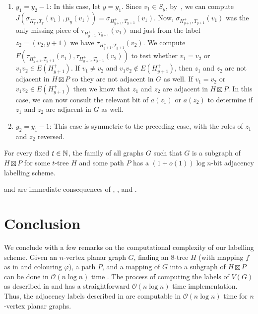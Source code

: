 \documentclass[kpfonts]{patmorin}
\newcommand{\Oh}{\mathcal{O}}
\let\le\leqslant
\begin{document}
\begin{enumerate}
  \item $y_1=y_2-1$: 
  In this case, let $y=y_1$. 
  Since $v_1 \in S_y$, by~,
  we can compute $J(\sigma_{H^+_y,T_y}(v_1),\mu_y(v_1))=\sigma_{H^+_{y+1},T_{y+1}}(v_1)$. 
  Now, $\sigma_{H^+_{y+1},T_{y+1}}(v_1)$ was the only missing piece of $\tau_{H^+_{y+1},T_{y+1}}(v_1)$ and 
  just from the label $z_2=(v_2,y+1)$ we have $\tau_{H^+_{y+1},T_{y+1}}(v_2)$. 
  We compute $F(\tau_{H^+_{y+1},T_{y+1}}(v_1),\tau_{H^+_{y+1},T_{y+1}}(v_2))$ to test whether $v_1=v_2$ or $v_1v_2\in E(H^+_{y+1})$. 
  If $v_1\neq v_2$ and $v_1v_2\not\in E(H^+_{y+1})$, then $z_1$ and $z_2$ are not adjacent in $H\boxtimes P$ so they are not adjacent in $G$ as well.
  If $v_1=v_2$ or $v_1v_2\in E(H^+_{y+1})$ then we know that $z_1$ and $z_2$ are adjacent in $H\boxtimes P$.  
  In this case, we can now consult the relevant bit of $a(z_1)$ or $a(z_2)$ to determine if $z_1$ and $z_2$ are adjacent in $G$ as well.

  \item $y_2=y_1-1$:  This case is symmetric to the preceding case, with the roles of $z_1$ and $z_2$ reversed.
\end{enumerate}


\begin{thm}
  For every fixed $t\in\mathbb{N}$, the family of all graphs $G$ such that $G$ is a subgraph of $H\boxtimes P$ for some $t$-tree $H$ and some path $P$ has a $(1+o(1))\log n$-bit adjacency labelling scheme.
\end{thm}

 and  are immediate consequences of , , and .



\section{Conclusion}

We conclude with a few remarks on the computational complexity of our labelling scheme.  Given an $n$-vertex planar graph $G$, finding an 8-tree $H$ (with mapping $f$ as in  and colouring $\varphi$), a path $P$, and a mapping of $G$ into a subgraph of $H\boxtimes P$ can be done in $\Oh(n\log n)$ time \cite{morin:fast}.  The process of computing the labels of $V(G)$ as described in  and  has a straightforward $\Oh(n\log n)$ time implementation.  Thus, the adjacency labels described in  are computable in $\Oh(n\log n)$ time for $n$-vertex planar graphs.
\end{document}
